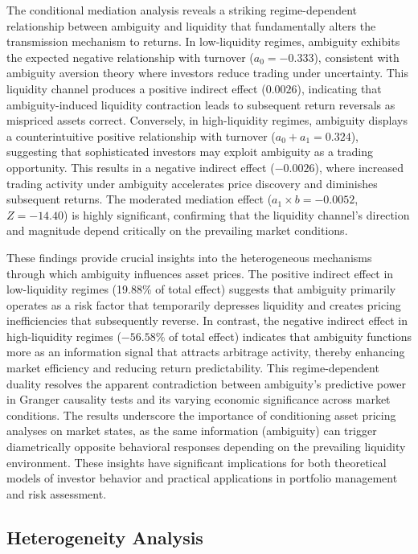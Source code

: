 \documentclass[preprint,12pt,authoryear]{elsarticle}
\begin{document}
The conditional mediation analysis reveals a striking regime-dependent relationship between ambiguity and liquidity that fundamentally alters the transmission mechanism to returns. In low-liquidity regimes, ambiguity exhibits the expected negative relationship with turnover ($a_{0} = -0.333$), consistent with ambiguity aversion theory where investors reduce trading under uncertainty. This liquidity channel produces a positive indirect effect ($0.0026$), indicating that ambiguity-induced liquidity contraction leads to subsequent return reversals as mispriced assets correct. Conversely, in high-liquidity regimes, ambiguity displays a counterintuitive positive relationship with turnover ($a_{0} + a_{1} = 0.324$), suggesting that sophisticated investors may exploit ambiguity as a trading opportunity. This results in a negative indirect effect ($-0.0026$), where increased trading activity under ambiguity accelerates price discovery and diminishes subsequent returns. The moderated mediation effect ($a_{1} \times b = -0.0052$, $Z = -14.40$) is highly significant, confirming that the liquidity channel's direction and magnitude depend critically on the prevailing market conditions.

These findings provide crucial insights into the heterogeneous mechanisms through which ambiguity influences asset prices. The positive indirect effect in low-liquidity regimes (19.88\% of total effect) suggests that ambiguity primarily operates as a risk factor that temporarily depresses liquidity and creates pricing inefficiencies that subsequently reverse. In contrast, the negative indirect effect in high-liquidity regimes ($-56.58\%$ of total effect) indicates that ambiguity functions more as an information signal that attracts arbitrage activity, thereby enhancing market efficiency and reducing return predictability. This regime-dependent duality resolves the apparent contradiction between ambiguity's predictive power in Granger causality tests and its varying economic significance across market conditions. The results underscore the importance of conditioning asset pricing analyses on market states, as the same information (ambiguity) can trigger diametrically opposite behavioral responses depending on the prevailing liquidity environment. These insights have significant implications for both theoretical models of investor behavior and practical applications in portfolio management and risk assessment.

\subsection{Heterogeneity Analysis} \label{sec:heterogeneity_analysis}
\end{document}
